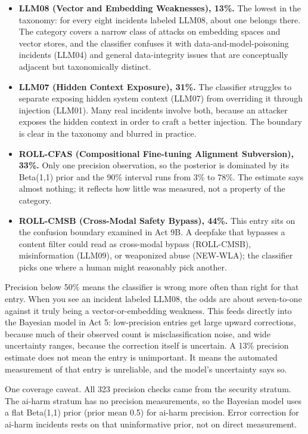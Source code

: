 \documentclass[11pt]{article}
\providecommand{\tightlist}{%
  \setlength{\itemsep}{0pt}\setlength{\parskip}{0pt}}
\begin{document}
\begin{itemize}
\tightlist
\item
  \textbf{LLM08 (Vector and Embedding Weaknesses), 13\%.} The lowest in
  the taxonomy: for every eight incidents labeled LLM08, about one
  belongs there. The category covers a narrow class of attacks on
  embedding spaces and vector stores, and the classifier confuses it
  with data-and-model-poisoning incidents (LLM04) and general
  data-integrity issues that are conceptually adjacent but taxonomically
  distinct.
\item
  \textbf{LLM07 (Hidden Context Exposure), 31\%.} The classifier
  struggles to separate exposing hidden system context (LLM07) from
  overriding it through injection (LLM01). Many real incidents involve
  both, because an attacker exposes the hidden context in order to craft
  a better injection. The boundary is clear in the taxonomy and blurred
  in practice.
\item
  \textbf{ROLL-CFAS (Compositional Fine-tuning Alignment Subversion),
  33\%.} Only one precision observation, so the posterior is dominated
  by its Beta(1,1) prior and the 90\% interval runs from 3\% to 78\%.
  The estimate says almost nothing; it reflects how little was measured,
  not a property of the category.
\item
  \textbf{ROLL-CMSB (Cross-Modal Safety Bypass), 44\%.} This entry sits
  on the confusion boundary examined in Act 9B. A deepfake that bypasses
  a content filter could read as cross-modal bypass (ROLL-CMSB),
  misinformation (LLM09), or weaponized abuse (NEW-WLA); the classifier
  picks one where a human might reasonably pick another.
\end{itemize}

Precision below 50\% means the classifier is wrong more often than right
for that entry. When you see an incident labeled LLM08, the odds are
about seven-to-one against it truly being a vector-or-embedding
weakness. This feeds directly into the Bayesian model in Act 5:
low-precision entries get large upward corrections, because much of
their observed count is misclassification noise, and wide uncertainty
ranges, because the correction itself is uncertain. A 13\% precision
estimate does not mean the entry is unimportant. It means the automated
measurement of that entry is unreliable, and the model's uncertainty
says so.

One coverage caveat. All 323 precision checks came from the security
stratum. The ai-harm stratum has no precision measurements, so the
Bayesian model uses a flat Beta(1,1) prior (prior mean 0.5) for ai-harm
precision. Error correction for ai-harm incidents rests on that
uninformative prior, not on direct measurement.
\end{document}
